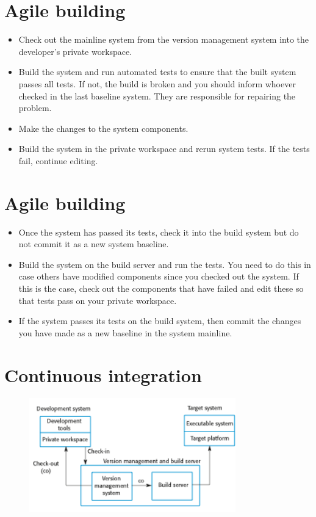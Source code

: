 \section{Agile building}
\begin{itemize}

\item Check out the mainline system from the version management system into the developer’s private workspace.

\item Build the system and run automated tests to ensure that the built system passes all tests. If not, the build is broken and you should inform whoever checked in the last baseline system. They are responsible for repairing the problem.

\item Make the changes to the system components.

\item Build the system in the private workspace and rerun system tests. If the tests fail, continue editing.


\end{itemize}
\section{Agile building}
\begin{itemize}

\item Once the system has passed its tests, check it into the build system but do not commit it as a new system baseline.

\item Build the system on the build server and run the tests. You need to do this in case others have modified components since you checked out the system. If this is the case, check out the components that have failed and edit these so that tests pass on your private workspace.

\item If the system passes its tests on the build system, then commit the changes you have made as a new baseline in the system mainline.
\end{itemize}

\newpage
\section{Continuous integration}
\begin{figure}[h!]
    \centering
    \includegraphics[width = 0.8\textwidth]{./figures/L8_7.png}
    \caption{}
    \label{fig:L8_9}
\end{figure}


